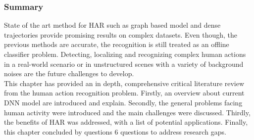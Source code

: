\subsubsection{Summary}
\hspace{5mm} State of the art method for HAR such as graph based model and dense trajectories provide promising results on complex datasets. Even though, the previous methods are accurate, the recognition is still treated as an offline classifier problem. Detecting, localizing and recognizing complex human actions in a real-world scenario or in unstructured scenes with a variety of background noises are the future challenges to develop.\\

This chapter has provided an in depth, comprehensive critical literature review from the human action recognition problem. Firstly, an overview about current DNN model are introduced and explain. Secondly, the general problems facing human activity were introduced and the main challenges were discussed. Thirdly, the benefits of HAR was addressed, with a list of potential applications. Finally, this chapter concluded by questions 6 questions to address research gaps.

